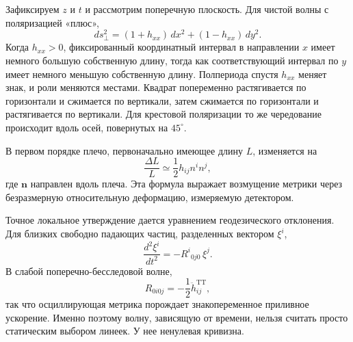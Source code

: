 Зафиксируем \(z\) и \(t\) и рассмотрим поперечную плоскость. Для чистой волны с поляризацией «плюс»,
\begin{equation}
 ds_\perp^2
 =(1+h_{xx})\,dx^2+(1-h_{xx})\,dy^2.
 \label{eq:transverse-distance}
\end{equation}
Когда \(h_{xx}>0\), фиксированный координатный интервал в направлении \(x\) имеет немного большую собственную длину, тогда как соответствующий интервал по \(y\) имеет немного меньшую собственную длину. Полпериода спустя \(h_{xx}\) меняет знак, и роли меняются местами. Квадрат попеременно растягивается по горизонтали и сжимается по вертикали, затем сжимается по горизонтали и растягивается по вертикали. Для крестовой поляризации то же чередование происходит вдоль осей, повернутых на \(45^\circ\).

В первом порядке плечо, первоначально имеющее длину \(L\), изменяется на
\begin{equation}
 \frac{\Delta L}{L}\simeq\frac12 h_{ij}n^i n^j,
 \label{eq:fractional-strain}
\end{equation}
где \(\mathbf n\) направлен вдоль плеча. Эта формула выражает возмущение метрики через безразмерную относительную деформацию, измеряемую детектором.

\begin{classroomqa}
\end{classroomqa}

Точное локальное утверждение дается уравнением геодезического отклонения. Для близких свободно падающих частиц, разделенных вектором \(\xi^i\),
\begin{equation}
 \frac{d^2\xi^i}{dt^2}
 =-R^i{}_{0j0}\,\xi^j.
 \label{eq:geodesic-deviation}
\end{equation}
В слабой поперечно-бесследовой волне,
\begin{equation}
 R_{0i0j}=-\frac12\ddot h^{\mathrm{TT}}_{ij},
 \label{eq:tidal-curvature}
\end{equation}
так что осциллирующая метрика порождает знакопеременное приливное ускорение. Именно поэтому волну, зависящую от времени, нельзя считать просто статическим выбором линеек. У нее ненулевая кривизна.

